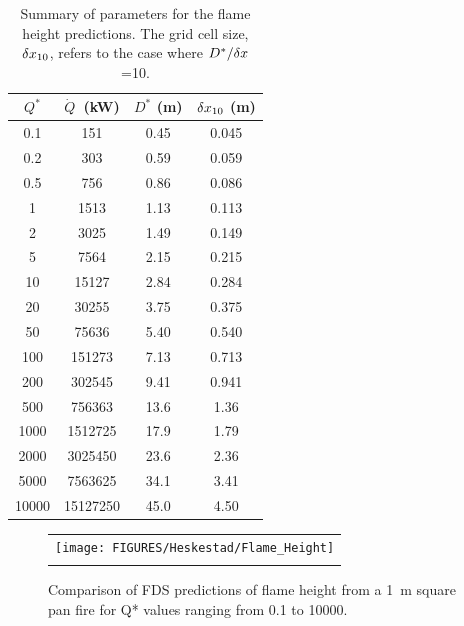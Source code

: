 \begin{table}[h!]
\caption{Summary of parameters for the flame height predictions. The grid cell size, $\delta x_{10}$, refers to the case where $D^*/\delta x$=10.}
\begin{center}
\begin{tabular}{|c|c|c|c|}
\hline
$Q^*$       & $\dot{Q}$~(kW)   & $D^*$ (m)  & $\delta x_{10}$ (m)  \\ \hline \hline
0.1         &   151         & 0.45    &   0.045   \\ \hline
0.2         &   303         & 0.59    &   0.059   \\ \hline
0.5         &   756         & 0.86    &   0.086   \\ \hline
1           &   1513        & 1.13    &   0.113   \\ \hline
2           & 3025          & 1.49    &   0.149   \\ \hline
5           & 7564          & 2.15    &   0.215   \\ \hline
10          &  15127        & 2.84    &   0.284   \\ \hline
20          &  30255        & 3.75    &   0.375   \\ \hline
50          &  75636        & 5.40    &   0.540   \\ \hline
100         &   151273      & 7.13    &   0.713   \\ \hline
200         &   302545      & 9.41    &   0.941   \\ \hline
500         &   756363      & 13.6    &   1.36    \\ \hline
1000        &   1512725     & 17.9    &   1.79    \\ \hline
2000        &   3025450     & 23.6    &   2.36    \\ \hline
5000        &   7563625     & 34.1    &   3.41    \\ \hline
10000       &   15127250    & 45.0    &   4.50    \\ \hline
\end{tabular}
\end{center}
\label{Flame_Height_Parameters}
\end{table}

\newpage

\begin{figure}[p]
\begin{center}
\begin{tabular}{c}
\texttt{[image: FIGURES/Heskestad/Flame\_Height]} \\
\vspace{0.25in} \\
\end{tabular}
\end{center}
\caption[Summary of flame height predictions, Heskestad correlation.]
{Comparison of FDS predictions of flame height from a 1~m square pan fire for Q* values ranging from
0.1 to 10000.}
\label{Flame_Height}
\end{figure}

